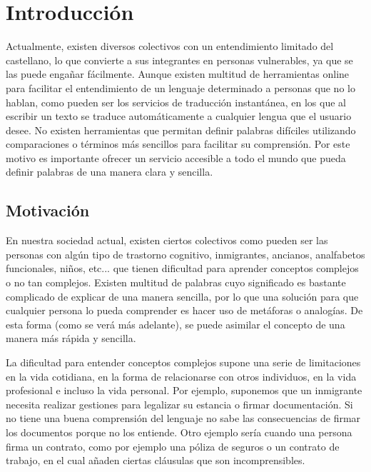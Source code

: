 \chapter{Introducción}
\label{cap:introduccion}

Actualmente, existen diversos colectivos con un entendimiento limitado del castellano, lo que convierte a sus integrantes en personas vulnerables, ya que se las puede engañar fácilmente. Aunque existen multitud de herramientas online para facilitar el entendimiento de un lenguaje determinado a personas que no lo hablan, como pueden ser los servicios de traducción instantánea, en los que al escribir un texto se traduce automáticamente a cualquier lengua que el usuario desee. No existen herramientas que permitan definir palabras difíciles utilizando comparaciones o términos más sencillos para facilitar su comprensión. 
Por este motivo es importante ofrecer un servicio accesible a todo el mundo que pueda definir palabras de una manera clara y sencilla.
 

	


\section{Motivación}
\label{cap:sec:motivacion}

En nuestra sociedad actual, existen ciertos colectivos como pueden ser las personas con algún tipo de trastorno cognitivo, inmigrantes, ancianos, analfabetos funcionales, niños, etc... que tienen dificultad para aprender conceptos complejos o no tan complejos. 
Existen multitud de palabras cuyo significado es bastante complicado de explicar de una manera sencilla, por lo que una solución para que cualquier persona lo pueda comprender es hacer uso de metáforas o analogías. De esta forma (como se verá más adelante), se puede asimilar el concepto de una manera más rápida y sencilla. 

La dificultad para entender conceptos complejos supone una serie de limitaciones en la vida cotidiana, en la forma de relacionarse con otros individuos, en la vida profesional e incluso la vida personal. Por ejemplo, suponemos que un inmigrante necesita realizar gestiones para legalizar su estancia o firmar documentación. Si no tiene una buena comprensión del lenguaje no sabe las consecuencias de firmar los documentos porque no los entiende. 
Otro ejemplo sería cuando una persona firma un contrato, como por ejemplo una póliza de seguros o un contrato de trabajo, en el cual añaden ciertas cláusulas que son incomprensibles. 



